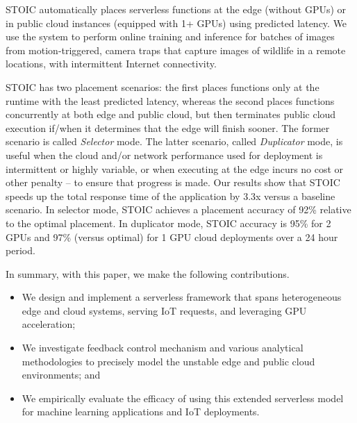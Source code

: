 STOIC automatically places serverless functions at the edge (without GPUs) or in public cloud instances (equipped with 1+ GPUs) using predicted latency.
We use the system to perform online training and inference for batches of images from motion-triggered, camera traps that capture images of wildlife in a remote locations, with intermittent Internet connectivity.


STOIC has two placement scenarios: the first places functions only at the runtime with the least predicted latency, whereas the second places functions concurrently at both edge and public cloud, but then terminates public cloud execution if/when it determines that the edge will finish sooner. The former scenario is called \textit{Selector} mode. The latter scenario, called \textit{Duplicator} mode, is useful when the cloud and/or network performance used for deployment is intermittent or highly variable, or when executing at the edge incurs no cost or other penalty -- to ensure that progress is made. Our results show that STOIC speeds up the total response time of the application by 3.3x versus a baseline scenario. In selector mode, STOIC achieves a placement accuracy of 92\% relative to the optimal placement.  In duplicator mode, STOIC accuracy is 95\% for 2 GPUs and 97\% (versus optimal) for 1 GPU cloud deployments over a 24 hour period.

In summary, with this paper, we make the following contributions.
\begin{itemize}
\item We design and implement a serverless framework that spans heterogeneous edge and cloud systems, serving IoT requests, and leveraging GPU acceleration;
\item We investigate feedback control mechanism and various analytical methodologies to precisely model the unstable edge and public cloud environments; and 
\item We empirically evaluate the efficacy of using this extended serverless model for machine learning applications and IoT deployments.
\end{itemize}

